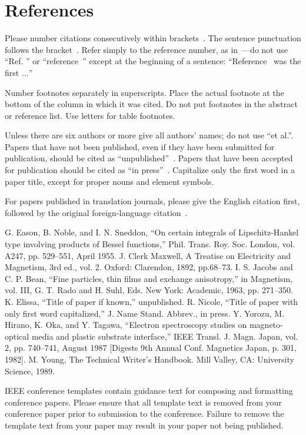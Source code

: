 \documentclass[conference]{IEEEtran}
\begin{document}
    \section*{References}

    Please number citations consecutively within brackets~\cite{b1}.
    The sentence punctuation follows the bracket~\cite{b2}.
    Refer simply to the reference number, as in~\cite{b3}---do not use ``Ref. \cite{b3}'' or ``reference~\cite{b3}'' except at the beginning of a sentence: ``Reference~\cite{b3} was the first $\ldots$''

    Number footnotes separately in superscripts.
    Place the actual footnote at
    the bottom of the column in which it was cited.
    Do not put footnotes in the abstract or reference list.
    Use letters for table footnotes.

    Unless there are six authors or more give all authors' names; do not use ``et al.''.
    Papers that have not been published, even if they have been submitted for publication, should be cited as ``unpublished''~\cite{b4}.
    Papers that have been accepted for publication should be cited as ``in press''~\cite{b5}.
    Capitalize only the first word in a paper title, except for proper nouns and element symbols.

    For papers published in translation journals, please give the English
    citation first, followed by the original foreign-language citation~\cite{b6}.

    \begin{thebibliography}{00}
         G. Eason, B. Noble, and I. N. Sneddon, ``On certain integrals of Lipschitz-Hankel type involving products of Bessel functions,'' Phil. Trans. Roy. Soc. London, vol. A247, pp. 529--551, April 1955.
         J. Clerk Maxwell, A Treatise on Electricity and Magnetism, 3rd ed., vol. 2. Oxford: Clarendon, 1892, pp.68--73.
         I. S. Jacobs and C. P. Bean, ``Fine particles, thin films and exchange anisotropy,'' in Magnetism, vol. III, G. T. Rado and H. Suhl, Eds. New York: Academic, 1963, pp. 271--350.
         K. Elissa, ``Title of paper if known,'' unpublished.
         R. Nicole, ``Title of paper with only first word capitalized,'' J. Name Stand. Abbrev., in press.
         Y. Yorozu, M. Hirano, K. Oka, and Y. Tagawa, ``Electron spectroscopy studies on magneto-optical media and plastic substrate interface,'' IEEE Transl. J. Magn. Japan, vol. 2, pp. 740--741, August 1987 [Digests 9th Annual Conf. Magnetics Japan, p. 301, 1982].
         M. Young, The Technical Writer's Handbook. Mill Valley, CA: University Science, 1989.
    \end{thebibliography}
    \vspace{12pt}
    \color{red}
    IEEE conference templates contain guidance text for composing and formatting conference papers. Please ensure that all template text is removed from your conference paper prior to submission to the conference. Failure to remove the template text from your paper may result in your paper not being published.
\end{document}
